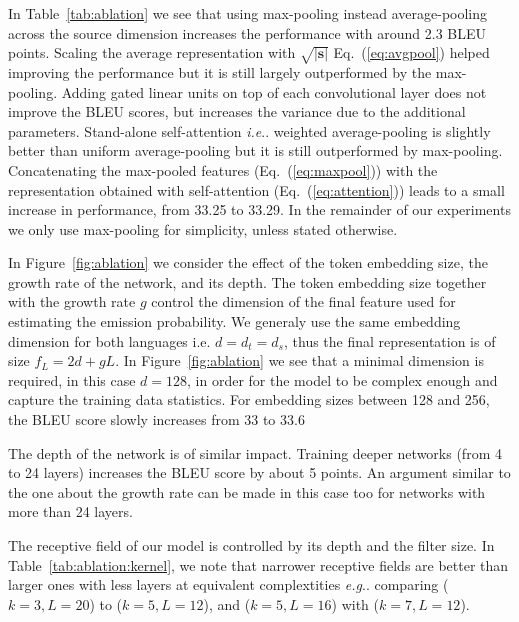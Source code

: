 \documentclass[11pt,a4paper]{article}
\makeatletter
\DeclareRobustCommand\onedot{\futurelet\@let@token\@onedot}
\def\@onedot{\ifx\@let@token.\else.\null\fi\xspace}
\def\eg{\emph{e.g}\onedot} \def\Eg{\emph{E.g}\onedot}
\def\ie{\emph{i.e}\onedot} \def\Ie{\emph{I.e}\onedot}
\def\fig#1{Figure~\ref{fig:#1}}
\def\tab#1{Table~\ref{tab:#1}}
\def\Eq#1{Eq.~(\ref{eq:#1})}
\newcommand{\lsrc}{{|\boldsymbol s|}}
\makeatother
\begin{document}
In \tab{ablation} we see that using max-pooling instead average-pooling across the source dimension increases the performance with around 2.3 BLEU points. 
Scaling the average representation with $\sqrt{\lsrc}$ \Eq{avgpool} helped improving the performance but it is still largely outperformed by the max-pooling.
Adding gated linear units on top of each convolutional layer does not improve the BLEU scores, but increases the variance due to the additional parameters. 
Stand-alone self-attention \ie weighted average-pooling is slightly better than uniform average-pooling but it is still outperformed by max-pooling. 
Concatenating the max-pooled features (\Eq{maxpool}) with the representation obtained with self-attention (\Eq{attention}) leads to a small increase in performance, from 33.25 to 33.29. In the remainder of our experiments we only use max-pooling for simplicity, unless stated otherwise. 

In \fig{ablation} we consider the effect of the token embedding size, the growth rate of the network, and its depth. 
The token embedding size together with the growth rate $g$ control the dimension of the final feature used for estimating the emission probability. We generaly use the same embedding dimension for both languages i.e. $d=d_t=d_s$, thus the final representation is of size $f_L = 2 d + gL$.
In \fig{ablation} we see that a minimal dimension is required, in this case $d=128$, in order for the model to be complex enough and capture the training data statistics.
For embedding sizes between 128 and 256, the BLEU score slowly increases from 33 to 33.6


The depth of the network is of similar impact. Training deeper networks (from 4 to 24 layers)  increases the BLEU score by about 5 points.
An argument similar to the one about the growth rate can be made in this case too for networks with more than 24 layers.

The receptive field of our model is controlled by its depth and the filter size. In \tab{ablation:kernel}, we note that
narrower receptive fields are better than larger ones with less layers at equivalent complextities \eg comparing ($k\!=\!3, L\!=\!20$) to ($k\!=\!5, L\!=\!12$), and ($k\!=\!5, L\!=\!16$) with ($k\!=\!7, L\!=\!12$).
\end{document}
